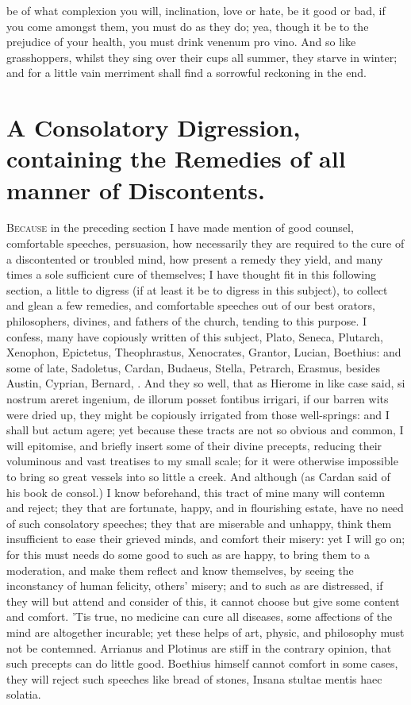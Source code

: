 {be of what complexion you will, inclination, love or hate, be it good
or bad, if you come amongst them, you must do as they do; yea,
though it be to the prejudice of your health, you must drink
venenum pro vino. And so like grasshoppers, whilst they sing over their
cups all summer, they starve in winter; and for a little vain merriment
shall find a sorrowful reckoning in the end.



\section[A Consolatory Digression]{A Consolatory Digression, containing the Remedies of all manner of Discontents.}

\lettrine{B}{ecause} in the preceding section I have made mention of good counsel,
comfortable speeches, persuasion, how necessarily they are required to
the cure of a discontented or troubled mind, how present a remedy they
yield, and many times a sole sufficient cure of themselves; I have
thought fit in this following section, a little to digress (if at least
it be to digress in this subject), to collect and glean a few remedies,
and comfortable speeches out of our best orators, philosophers,
divines, and fathers of the church, tending to this purpose. I confess,
many have copiously written of this subject, Plato, Seneca, Plutarch,
Xenophon, Epictetus, Theophrastus, Xenocrates, Grantor, Lucian,
Boethius: and some of late, Sadoletus, Cardan, Budaeus, Stella,
Petrarch, Erasmus, besides Austin, Cyprian, Bernard, \etc{}. And they so
well, that as Hierome in like case said, si nostrum areret ingenium, de
illorum posset fontibus irrigari, if our barren wits were dried up,
they might be copiously irrigated from those well-springs: and I shall
but actum agere; yet because these tracts are not so obvious and
common, I will epitomise, and briefly insert some of their divine
precepts, reducing their voluminous and vast treatises to my small
scale; for it were otherwise impossible to bring so great vessels into
so little a creek. And although (as Cardan said of his book de consol.)
I know beforehand, this tract of mine many will contemn and
reject; they that are fortunate, happy, and in flourishing estate, have
no need of such consolatory speeches; they that are miserable and
unhappy, think them insufficient to ease their grieved minds, and
comfort their misery: yet I will go on; for this must needs do some
good to such as are happy, to bring them to a moderation, and make them
reflect and know themselves, by seeing the inconstancy of human
felicity, others' misery; and to such as are distressed, if they will
but attend and consider of this, it cannot choose but give some content
and comfort. 'Tis true, no medicine can cure all diseases, some
affections of the mind are altogether incurable; yet these helps of
art, physic, and philosophy must not be contemned. Arrianus and
Plotinus are stiff in the contrary opinion, that such precepts can do
little good. Boethius himself cannot comfort in some cases, they will
reject such speeches like bread of stones, Insana stultae mentis haec
solatia. 

}
